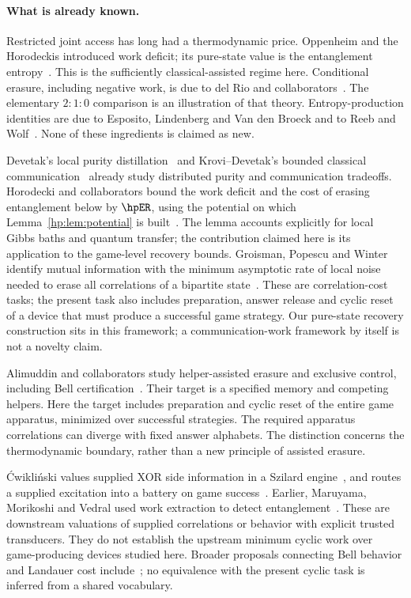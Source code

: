 \paragraph{What is already known.}
Restricted joint access has long had a thermodynamic price. Oppenheim and the Horodeckis introduced work deficit; its pure-state value is the entanglement entropy~\cite{HPdeficit}. This is the sufficiently classical-assisted regime here. Conditional erasure, including negative work, is due to del Rio and collaborators~\cite{delRio11}. The elementary $2:1:0$ comparison is an illustration of that theory. Entropy-production identities are due to Esposito, Lindenberg and Van den Broeck and to Reeb and Wolf~\cite{EspositoLindenbergVandenBroeck10,ReebWolf14}. None of these ingredients is claimed as new.

Devetak's local purity distillation~\cite{HPdevetak} and Krovi--Devetak's bounded classical communication~\cite{HPkrovi} already study distributed purity and communication tradeoffs. Horodecki and collaborators bound the work deficit and the cost of erasing entanglement below by $\hpER$, using the potential on which Lemma~\ref{hp:lem:potential} is built~\cite{HPlocalnonlocal}. The lemma accounts explicitly for local Gibbs baths and quantum transfer; the contribution claimed here is its application to the game-level recovery bounds. Groisman, Popescu and Winter identify mutual information with the minimum asymptotic rate of local noise needed to erase all correlations of a bipartite state~\cite{HPgpw}. These are correlation-cost tasks; the present task also includes preparation, answer release and cyclic reset of a device that must produce a successful game strategy. Our pure-state recovery construction sits in this framework; a communication-work framework by itself is not a novelty claim.

Alimuddin and collaborators study helper-assisted erasure and exclusive control, including Bell certification~\cite{HPalimuddin}. Their target is a specified memory and competing helpers. Here the target includes preparation and cyclic reset of the entire game apparatus, minimized over successful strategies. The required apparatus correlations can diverge with fixed answer alphabets. The distinction concerns the thermodynamic boundary, rather than a new principle of assisted erasure.

\'Cwikli\'nski values supplied XOR side information in a Szilard engine~\cite{HPszilard}, and routes a supplied excitation into a battery on game success~\cite{HPbattery}. Earlier, Maruyama, Morikoshi and Vedral used work extraction to detect entanglement~\cite{HPthermodetection}. These are downstream valuations of supplied correlations or behavior with explicit trusted transducers. They do not establish the upstream minimum cyclic work over game-producing devices studied here. Broader proposals connecting Bell behavior and Landauer cost include~\cite{HPtodd}; no equivalence with the present cyclic task is inferred from a shared vocabulary.

